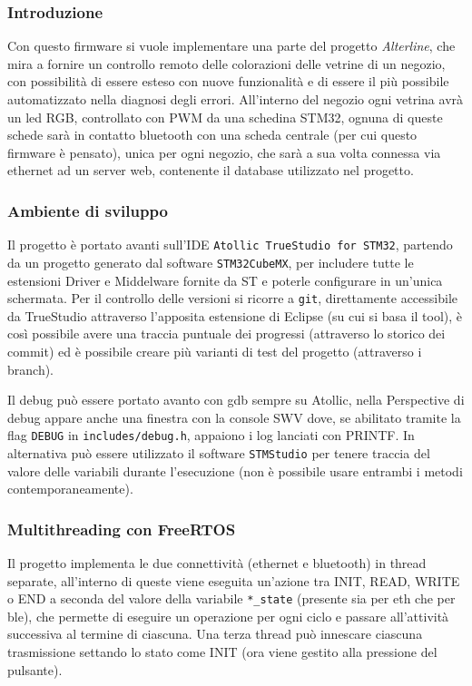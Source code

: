 \subsubsection{Introduzione}

Con questo firmware si vuole implementare una parte del progetto \textit{Alterline}, che mira a fornire un controllo remoto delle colorazioni delle vetrine di un negozio, con possibilit\`{a} di essere esteso con nuove funzionalit\`{a} e di essere il pi\`{u} possibile automatizzato nella diagnosi degli errori. All'interno del negozio ogni vetrina avr\`{a} un led RGB, controllato con PWM da una schedina STM32, ognuna di queste schede sar\`{a} in contatto bluetooth con una scheda centrale (per cui questo firmware \`{e} pensato), unica per ogni negozio, che sar\`{a} a sua volta connessa via ethernet ad un server web, contenente il database utilizzato nel progetto.

\subsubsection{Ambiente di sviluppo}

Il progetto \`{e} portato avanti sull'IDE \texttt{Atollic TrueStudio for STM32}, partendo da un progetto generato dal software \texttt{STM32CubeMX}, per includere tutte le estensioni Driver e Middelware fornite da ST e poterle configurare in un'unica schermata. Per il controllo delle versioni si ricorre a \texttt{git}, direttamente accessibile da TrueStudio attraverso l'apposita estensione di Eclipse (su cui si basa il tool), \`{e} cos\`{i} possibile avere una traccia puntuale dei progressi (attraverso lo storico dei commit) ed \`{e} possibile creare pi\`{u} varianti di test del progetto (attraverso i branch).

Il debug pu\`{o} essere portato avanto con gdb sempre su Atollic, nella Perspective di debug appare anche una finestra con la console SWV dove, se abilitato tramite la flag \texttt{DEBUG} in \texttt{includes/debug.h}, appaiono i log lanciati con PRINTF. In alternativa pu\`{o} essere utilizzato il software \texttt{STMStudio} per tenere traccia del valore delle variabili durante l'esecuzione (non \`{e} possibile usare entrambi i metodi contemporaneamente).

\subsubsection{Multithreading con FreeRTOS}

Il progetto implementa le due connettivit\`{a} (ethernet e bluetooth) in thread separate, all'interno di queste viene eseguita un'azione tra INIT, READ, WRITE o END a seconda del valore della variabile \texttt{*\_state} (presente sia per eth che per ble), che permette di eseguire un operazione per ogni ciclo e passare all'attivit\`{a} successiva al termine di ciascuna. Una terza thread pu\`{o} innescare ciascuna trasmissione settando lo stato come INIT (ora viene gestito alla pressione del pulsante).

